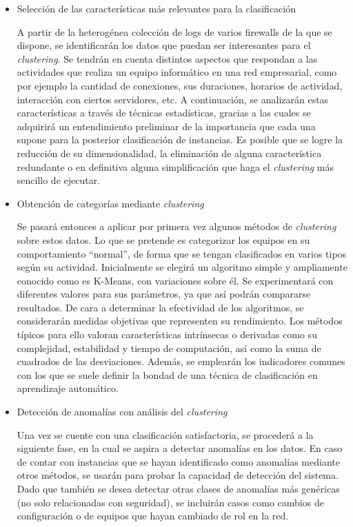 \begin{itemize}

    \item Selección de las características más relevantes para la clasificación

A partir de la heterogénea colección de logs de varios firewalls de la que se dispone, se identificarán los datos que puedan ser interesantes para el \emph{clustering}.
Se tendrán en cuenta distintos aspectos que respondan a las actividades que realiza un equipo informático en una red empresarial, como por ejemplo la cantidad de conexiones, sus duraciones, horarios de actividad, interacción con ciertos servidores, etc.
A continuación, se analizarán estas características a través de técnicas estadísticas, gracias a las cuales se adquirirá un entendimiento preliminar de la importancia que cada una supone para la posterior clasificación de instancias.
Es posible que se logre la reducción de su dimensionalidad, la eliminación de alguna característica redundante o en definitiva alguna simplificación que haga el \emph{clustering} más sencillo de ejecutar.

    \item Obtención de categorías mediante \emph{clustering}

Se pasará entonces a aplicar por primera vez algunos métodos de \emph{clustering} sobre estos datos.
Lo que se pretende es categorizar los equipos en su comportamiento ``normal'', de forma que se tengan clasificados en varios tipos según su actividad.
Inicialmente se elegirá un algoritmo simple y ampliamente conocido como es K-Means, con variaciones sobre él.
Se experimentará con diferentes valores para sus parámetros, ya que así podrán compararse resultados.
De cara a determinar la efectividad de los algoritmos, se considerarán medidas objetivas que representen su rendimiento.
Los métodos típicos para ello valoran características intrínsecas o derivadas como su complejidad, estabilidad y tiempo de computación, así como la suma de cuadrados de las desviaciones.
Además, se emplearán los indicadores comunes con los que se suele definir la bondad de una técnica de clasificación en aprendizaje automático.

    \item Detección de anomalías con análisis del \emph{clustering}

Una vez se cuente con una clasificación satisfactoria, se procederá a la siguiente fase, en la cual se aspira a detectar anomalías en los datos.
En caso de contar con instancias que se hayan identificado como anomalías mediante otros métodos, se usarán para probar la capacidad de detección del sistema.
Dado que también se desea detectar otras clases de anomalías más genéricas (no solo relacionadas con seguridad), se incluirán casos como cambios de configuración o de equipos que hayan cambiado de rol en la red.


\end{itemize}
